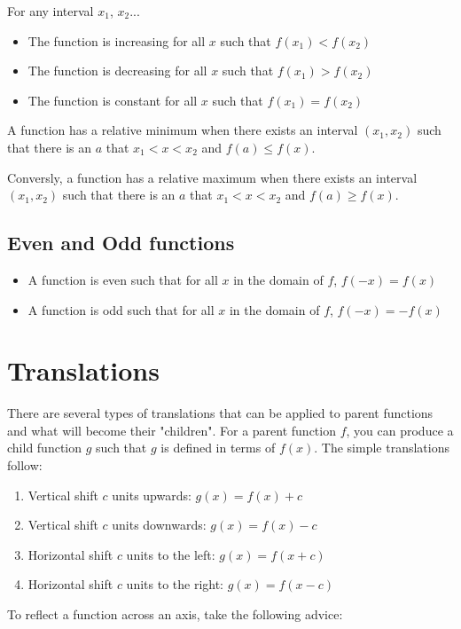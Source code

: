 For any interval $x_1$, $x_2$...
\begin{itemize}
\item The function is increasing for all $x$ such that $f(x_1)<f(x_2)$
\item The function is decreasing for all $x$ such that $f(x_1)>f(x_2)$
\item The function is constant for all $x$ such that $f(x_1)=f(x_2)$
\end{itemize}

A function has a relative minimum when there exists an interval $(x_1,x_2)$ such
that there is an $a$ that $x_1<x<x_2$ and $f(a) \leq f(x)$.

Conversly, a function has a relative maximum when there exists an interval
$(x_1,x_2)$ such that there is an $a$ that $x_1<x<x_2$ and $f(a) \geq f(x)$.

\subsection{Even and Odd functions}
\begin{itemize}
\item A function is even such that for all $x$ in the domain of $f$,
$f(-x)=f(x)$
\item A function is odd such that for all $x$ in the domain of $f$,
$f(-x)=-f(x)$
\end{itemize}

\section{Translations}
There are several types of translations that can be applied to parent functions
and what will become their "children".  For a parent function $f$, you can
produce a child function $g$ such that $g$ is defined in terms of $f(x)$.  The
simple translations follow:

\begin{enumerate}
\item Vertical shift $c$ units upwards: $g(x)=f(x)+c$
\item Vertical shift $c$ units downwards: $g(x)=f(x)-c$
\item Horizontal shift $c$ units to the left: $g(x)=f(x+c)$
\item Horizontal shift $c$ units to the right: $g(x)=f(x-c)$
\end{enumerate}

To reflect a function across an axis, take the following advice:

